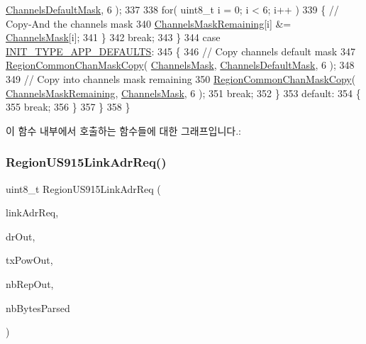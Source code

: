 \begin{DoxyCode}
      \mbox{\hyperlink{_region_u_s915_8c_ac127b19779301713d5ed92eb03366a2d}{ChannelsDefaultMask}}, 6 );
337 
338             \textcolor{keywordflow}{for}( uint8\_t i = 0; i < 6; i++ )
339             \{ \textcolor{comment}{// Copy-And the channels mask}
340                 \mbox{\hyperlink{_region_u_s915_8c_a567333cec639a004655cc1717e9d0928}{ChannelsMaskRemaining}}[i] &= \mbox{\hyperlink{_region_u_s915_8c_a2188957b5ca6af8092154d7ccbfa5757}{ChannelsMask}}[i];
341             \}
342             \textcolor{keywordflow}{break};
343         \}
344         \textcolor{keywordflow}{case} \mbox{\hyperlink{group___r_e_g_i_o_n_gga11ecad794560a3d3961bdf1c9a27d3b2a3d260b94611dd833c5243c16ca26c3f0}{INIT\_TYPE\_APP\_DEFAULTS}}:
345         \{
346             \textcolor{comment}{// Copy channels default mask}
347             \mbox{\hyperlink{group___r_e_g_i_o_n_c_o_m_m_o_n_ga95f5199d490113269fae7f2e0569e9a0}{RegionCommonChanMaskCopy}}( \mbox{\hyperlink{_region_u_s915_8c_a2188957b5ca6af8092154d7ccbfa5757}{ChannelsMask}}, 
      \mbox{\hyperlink{_region_u_s915_8c_ac127b19779301713d5ed92eb03366a2d}{ChannelsDefaultMask}}, 6 );
348 
349             \textcolor{comment}{// Copy into channels mask remaining}
350             \mbox{\hyperlink{group___r_e_g_i_o_n_c_o_m_m_o_n_ga95f5199d490113269fae7f2e0569e9a0}{RegionCommonChanMaskCopy}}( 
      \mbox{\hyperlink{_region_u_s915_8c_a567333cec639a004655cc1717e9d0928}{ChannelsMaskRemaining}}, \mbox{\hyperlink{_region_u_s915_8c_a2188957b5ca6af8092154d7ccbfa5757}{ChannelsMask}}, 6 );
351             \textcolor{keywordflow}{break};
352         \}
353         \textcolor{keywordflow}{default}:
354         \{
355             \textcolor{keywordflow}{break};
356         \}
357     \}
358 \}
\end{DoxyCode}
이 함수 내부에서 호출하는 함수들에 대한 그래프입니다.\+:
\mbox{\label{group___r_e_g_i_o_n_u_s915_gab4977ffc251303aaae4efec0eed63c23}} 
\subsubsection{\texorpdfstring{Region\+U\+S915\+Link\+Adr\+Req()}{RegionUS915LinkAdrReq()}}
{\footnotesize\ttfamily uint8\+\_\+t Region\+U\+S915\+Link\+Adr\+Req (\begin{DoxyParamCaption}\item[{\mbox{\hyperlink{group___r_e_g_i_o_n_gad4af503e8d4de1846129e26a799a1e8e}{Link\+Adr\+Req\+Params\+\_\+t}} $\ast$}]{link\+Adr\+Req,  }\item[{int8\+\_\+t $\ast$}]{dr\+Out,  }\item[{int8\+\_\+t $\ast$}]{tx\+Pow\+Out,  }\item[{uint8\+\_\+t $\ast$}]{nb\+Rep\+Out,  }\item[{uint8\+\_\+t $\ast$}]{nb\+Bytes\+Parsed }\end{DoxyParamCaption})}



